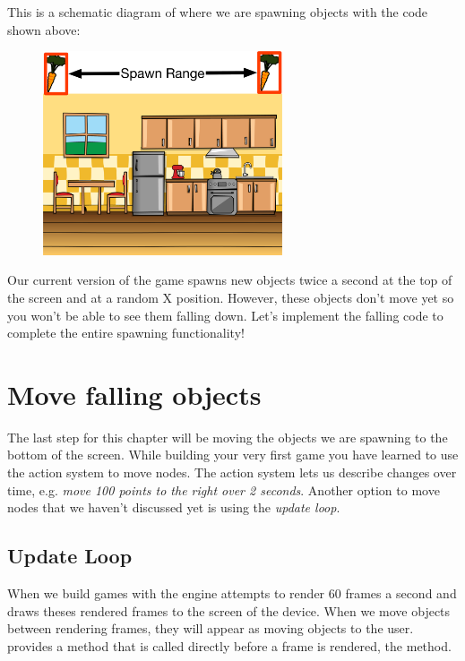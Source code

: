 This is a schematic diagram of where we are spawning objects with the code shown
above:

\begin{figure}[H]
		\centering
		\includegraphics[width=200pt]{images/Chapter2/SpawnObjects.png}
\end{figure}

Our current version of the game spawns new objects twice a second at the top of
the screen and at a random X position. However, these objects don't move yet so
you won't be able to see them falling down. Let's implement the falling code to
complete the entire spawning functionality!

\section{Move falling objects}
The last step for this chapter will be moving the objects we are spawning to the
bottom of the screen. While building your very first \SB{} game you have learned
to use the \cocos{} action system to move nodes. The action system lets us
describe changes over time, e.g. \textit{move 100 points to the right over 2
seconds}. Another option to move nodes that we haven't
discussed yet is using the \cocos{} \textit{update loop}.

\subsection{Update Loop}
When we build games with \cocos{} the engine attempts to render 60 frames a
second and draws theses rendered frames to the screen of the device. When we
move objects between rendering frames, they will appear as moving objects to the
user. \cocos{} provides a method that is called directly before a frame is
rendered, the  method.

